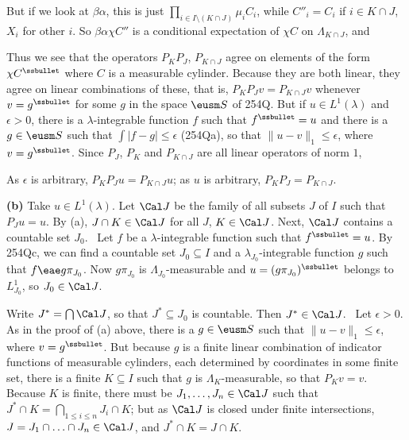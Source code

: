 {\noindent But if we look at $\beta\alpha$, this is just
$\prod_{i\in I\setminus(K\cap J)}\mu_iC_i$, while $C''_i=C_i$ if
$i\in K\cap J$,
$X_i$ for other $i$.   So $\beta\alpha\chi C''$ is a conditional
expectation of $\chi C$ on $\Lambda_{K\cap J}$, and


\medskip

 Thus we see that the operators $P_KP_J$, $P_{K\cap J}$
agree on elements of the form $\chi C^{\ssbullet}$ where $C$ is a
measurable cylinder.   Because they are both linear, they agree on
linear combinations of these, that is, $P_KP_Jv=P_{K\cap J}v$ whenever
$v=g^{\ssbullet}$ for some $g$ in the space $\eusm S$ of 254Q.   But if
$u\in L^1(\lambda)$ and $\epsilon>0$, there is a $\lambda$-integrable
function  $f$ such that $f^{\ssbullet}=u$ and there is a $g\in\eusm S$
such that $\int|f-g|\le\epsilon$ (254Qa), so that
$\|u-v\|_1\le\epsilon$, where $v=g^{\ssbullet}$.   Since $P_J$, $P_K$
and $P_{K\cap J}$ are all linear operators of norm $1$,


\noindent As $\epsilon$ is arbitrary, $P_KP_Ju=P_{K\cap J}u$;  as $u$
is arbitrary, $P_KP_J=P_{K\cap J}$.

\medskip

{\bf (b)} Take $u\in L^1(\lambda)$.   Let $\Cal J$ be the family of all
subsets $J$ of $I$ such that $P_Ju=u$.   By (a), $J\cap K\in\Cal J$ for
all $J$, $K\in\Cal J$.   Next, $\Cal J$ contains a countable set $J_0$.
\Prf\ Let $f$ be a $\lambda$-integrable function such that
$f^{\ssbullet}=u$.   By 254Qc, we can find a countable set
$J_0\subseteq I$ and a $\lambda_{J_0}$-integrable function $g$ such that
$f\eae g\pi_{J_0}$.   Now $g\pi_{J_0}$ is $\Lambda_{J_0}$-measurable
and $u=(g\pi_{J_0})^{\ssbullet}$ belongs to $L^1_{J_0}$, so
$J_0\in\Cal J$.\ \Qed

Write $J^*=\bigcap\Cal J$, so that $J^*\subseteq J_0$ is countable.
Then $J^*\in\Cal J$.   \Prf\ Let $\epsilon>0$.   As in the proof of (a)
above, there is a $g\in\eusm S$ such that $\|u-v\|_1\le\epsilon$, where
$v=g^{\ssbullet}$.   But because $g$ is a finite linear combination of
indicator functions of measurable cylinders, each determined by
coordinates in some
finite set, there is a finite $K\subseteq I$ such that
$g$ is $\Lambda_K$-measurable, so that $P_Kv=v$.
Because $K$ is finite, there must be $J_1,\ldots,J_n\in\Cal J$ such that
$J^*\cap K=\bigcap_{1\le i\le n}J_i\cap K$;  but as $\Cal J$ is closed
under finite intersections, $J=J_1\cap\ldots\cap J_n\in\Cal J$, and
$J^*\cap K=J\cap K$.

}

